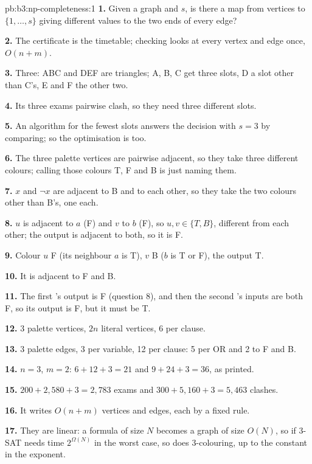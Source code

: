 \begin{solution}{pb:b3:np-completeness:1}
\textbf{1.} Given a graph and $s$, is there a map from vertices to $\{1, \ldots, s\}$ giving different values to the two ends of every edge?

\textbf{2.} The certificate is the timetable; checking looks at every vertex and edge once, $O(n + m)$.

\textbf{3.} Three: ABC and DEF are triangles; A, B, C get three slots, D a slot other than C's, E and F the other two.

\textbf{4.} Its three exams pairwise clash, so they need three different slots.

\textbf{5.} An algorithm for the fewest slots answers the decision with $s = 3$ by comparing; so the optimisation is  too.

\textbf{6.} The three palette vertices are pairwise adjacent, so they take three different colours; calling those colours T, F and B is just naming them.

\textbf{7.} $x$ and $\neg x$ are adjacent to B and to each other, so they take the two colours other than B's, one each.

\textbf{8.} $u$ is adjacent to $a$ (F) and $v$ to $b$ (F), so $u, v \in \{T, B\}$, different from each other; the output is adjacent to both, so it is F.

\textbf{9.} Colour $u$ F (its neighbour $a$ is T), $v$ B ($b$ is T or F), the output T.

\textbf{10.} It is adjacent to F and B.

\textbf{11.} The first 's output is F (question 8), and then the second 's inputs are both F, so its output is F, but it must be T.

\textbf{12.} 3 palette vertices, $2n$ literal vertices, 6 per clause.

\textbf{13.} 3 palette edges, 3 per variable, 12 per clause: 5 per OR  and 2 to F and B.

\textbf{14.} $n = 3$, $m = 2$: $6 + 12 + 3 = 21$ and $9 + 24 + 3 = 36$, as printed.

\textbf{15.} $200 + 2{,}580 + 3 = 2{,}783$ exams and $300 + 5{,}160 + 3 = 5{,}463$ clashes.

\textbf{16.} It writes $O(n + m)$ vertices and edges, each by a fixed rule.

\textbf{17.} They are linear: a formula of size $N$ becomes a graph of size $O(N)$, so if 3-SAT needs time $2^{\Omega(N)}$ in the worst case, so does 3-colouring, up to the constant in the exponent.


\end{solution}
